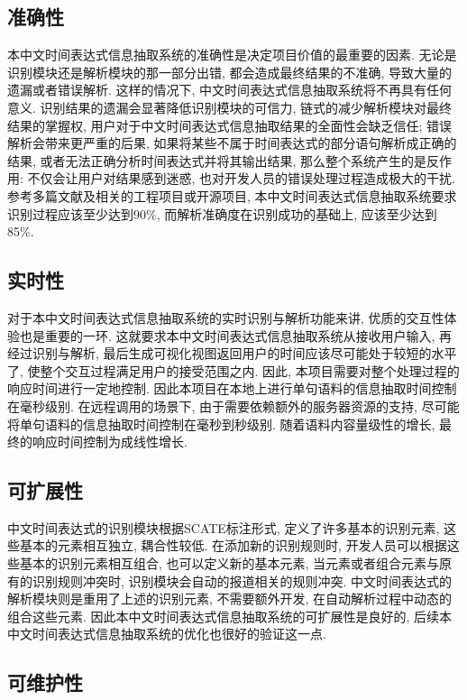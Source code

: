 \subsection{准确性}

本中文时间表达式信息抽取系统的准确性是决定项目价值的最重要的因素. 
无论是识别模块还是解析模块的那一部分出错, 都会造成最终结果的不准确, 导致大量的遗漏或者错误解析. 
这样的情况下, 中文时间表达式信息抽取系统将不再具有任何意义.
识别结果的遗漏会显著降低识别模块的可信力, 链式的减少解析模块对最终结果的掌握权, 用户对于中文时间表达式信息抽取结果的全面性会缺乏信任;
错误解析会带来更严重的后果, 如果将某些不属于时间表达式的部分语句解析成正确的结果, 或者无法正确分析时间表达式并将其输出结果, 那么整个系统产生的是反作用:
不仅会让用户对结果感到迷惑, 也对开发人员的错误处理过程造成极大的干扰. 
参考多篇文献及相关的工程项目或开源项目, 本中文时间表达式信息抽取系统要求识别过程应该至少达到90\%, 而解析准确度在识别成功的基础上, 应该至少达到85\%.

\subsection{实时性}

对于本中文时间表达式信息抽取系统的实时识别与解析功能来讲, 优质的交互性体验也是重要的一环. 
这就要求本中文时间表达式信息抽取系统从接收用户输入, 再经过识别与解析, 最后生成可视化视图返回用户的时间应该尽可能处于较短的水平了, 使整个交互过程满足用户的接受范围之内.
因此, 本项目需要对整个处理过程的响应时间进行一定地控制. 因此本项目在本地上进行单句语料的信息抽取时间控制在毫秒级别. 
在远程调用的场景下, 由于需要依赖额外的服务器资源的支持, 尽可能将单句语料的信息抽取时间控制在毫秒到秒级别. 
随着语料内容量级性的增长, 最终的响应时间控制为成线性增长.

\subsection{可扩展性}

中文时间表达式的识别模块根据SCATE标注形式, 定义了许多基本的识别元素, 这些基本的元素相互独立, 耦合性较低. 
在添加新的识别规则时, 开发人员可以根据这些基本的识别元素相互组合, 也可以定义新的基本元素, 当元素或者组合元素与原有的识别规则冲突时, 
识别模块会自动的报道相关的规则冲突.
中文时间表达式的解析模块则是重用了上述的识别元素, 不需要额外开发, 在自动解析过程中动态的组合这些元素. 
因此本中文时间表达式信息抽取系统的可扩展性是良好的, 后续本中文时间表达式信息抽取系统的优化也很好的验证这一点.


\subsection{可维护性}

